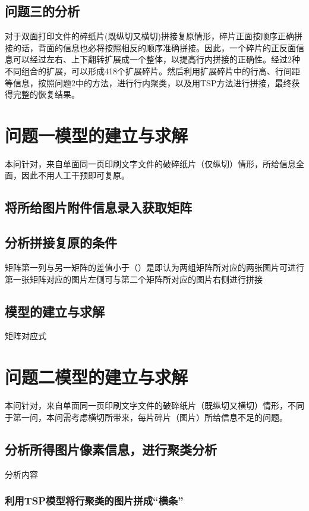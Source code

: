 \documentclass[12pt]{article}
\begin{document}
{       \subsection{问题三的分析}%
       对于双面打印文件的碎纸片(既纵切又横切)拼接复原情形，碎片正面按顺序正确拼接的话，背面的信息也必将按照相反的顺序准确拼接。因此，一个碎片的正反面信息可以经过左右、上下翻转扩展成一个整体，以提高行内拼接的正确性。经过2种不同组合的扩展，可以形成418个扩展碎片。然后利用扩展碎片中的行高、行间距等信息，按照问题2中的方法，进行行内聚类，以及用TSP方法进行拼接，最终获得完整的恢复结果。
       

       {\centering\section{问题一模型的建立与求解}}
       本问针对，来自单面同一页印刷文字文件的破碎纸片（仅纵切）情形，所给信息全面，因此不用人工干预即可复原。
       \subsection{将所给图片附件信息录入获取矩阵}
      \par

      \subsection{分析拼接复原的条件}
      矩阵第一列与另一矩阵的差值小于（）是即认为两组矩阵所对应的两张图片可进行第一张矩阵对应的图片左侧可与第二个矩阵所对应的图片右侧进行拼接
        
      \subsection{模型的建立与求解}
         矩阵对应式


       {\centering\section{问题二模型的建立与求解}}
       本问针对，来自单面同一页印刷文字文件的破碎纸片（既纵切又横切）情形，不同于第一问，本问需考虑横切所带来，每片碎片（图片）所给信息不足的问题。
       \subsection{分析所得图片像素信息，进行聚类分析}
       分析内容
        \subsubsection{利用TSP模型将行聚类的图片拼成“横条”}
      
}
\end{document}
